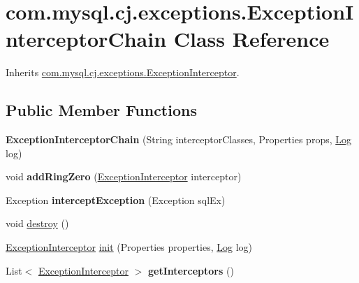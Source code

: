 \hypertarget{classcom_1_1mysql_1_1cj_1_1exceptions_1_1_exception_interceptor_chain}{}\section{com.\+mysql.\+cj.\+exceptions.\+Exception\+Interceptor\+Chain Class Reference}
\label{classcom_1_1mysql_1_1cj_1_1exceptions_1_1_exception_interceptor_chain}


Inherits \mbox{\hyperlink{interfacecom_1_1mysql_1_1cj_1_1exceptions_1_1_exception_interceptor}{com.\+mysql.\+cj.\+exceptions.\+Exception\+Interceptor}}.

\subsection*{Public Member Functions}
\begin{DoxyCompactItemize}
\item 
\mbox{\label{classcom_1_1mysql_1_1cj_1_1exceptions_1_1_exception_interceptor_chain_a9d0c16583102028171b421ce25df49b5}} 
{\bfseries Exception\+Interceptor\+Chain} (String interceptor\+Classes, Properties props, \mbox{\hyperlink{interfacecom_1_1mysql_1_1cj_1_1log_1_1_log}{Log}} log)
\item 
\mbox{\label{classcom_1_1mysql_1_1cj_1_1exceptions_1_1_exception_interceptor_chain_a0def64e930fdc316b18f850190198a7a}} 
void {\bfseries add\+Ring\+Zero} (\mbox{\hyperlink{interfacecom_1_1mysql_1_1cj_1_1exceptions_1_1_exception_interceptor}{Exception\+Interceptor}} interceptor)
\item 
\mbox{\label{classcom_1_1mysql_1_1cj_1_1exceptions_1_1_exception_interceptor_chain_a78c915d6aa11122e3fd845532ad29eb5}} 
Exception {\bfseries intercept\+Exception} (Exception sql\+Ex)
\item 
void \mbox{\hyperlink{classcom_1_1mysql_1_1cj_1_1exceptions_1_1_exception_interceptor_chain_a23c40128c6933d51a1c29055494180db}{destroy}} ()
\item 
\mbox{\hyperlink{interfacecom_1_1mysql_1_1cj_1_1exceptions_1_1_exception_interceptor}{Exception\+Interceptor}} \mbox{\hyperlink{classcom_1_1mysql_1_1cj_1_1exceptions_1_1_exception_interceptor_chain_ae29710eae9d22d426baabd3b2e589fec}{init}} (Properties properties, \mbox{\hyperlink{interfacecom_1_1mysql_1_1cj_1_1log_1_1_log}{Log}} log)
\item 
\mbox{\label{classcom_1_1mysql_1_1cj_1_1exceptions_1_1_exception_interceptor_chain_a417b11af060c97c112b0605df727e15b}} 
List$<$ \mbox{\hyperlink{interfacecom_1_1mysql_1_1cj_1_1exceptions_1_1_exception_interceptor}{Exception\+Interceptor}} $>$ {\bfseries get\+Interceptors} ()
\end{DoxyCompactItemize}


